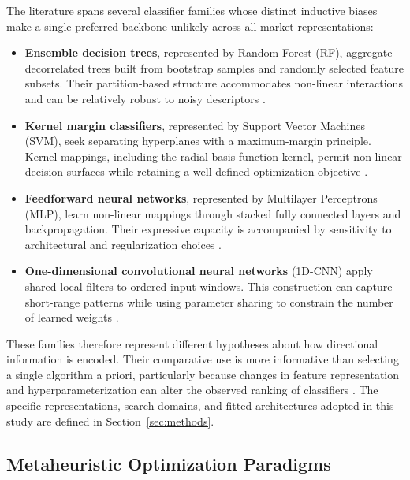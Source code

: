 The literature spans several classifier families whose distinct inductive biases make a single preferred backbone unlikely across all market representations:
\begin{itemize}
    \item \textbf{Ensemble decision trees}, represented by Random Forest (RF), aggregate decorrelated trees built from bootstrap samples and randomly selected feature subsets. Their partition-based structure accommodates non-linear interactions and can be relatively robust to noisy descriptors \cite{nabipour2020predicting}.
    \item \textbf{Kernel margin classifiers}, represented by Support Vector Machines (SVM), seek separating hyperplanes with a maximum-margin principle. Kernel mappings, including the radial-basis-function kernel, permit non-linear decision surfaces while retaining a well-defined optimization objective \cite{naik2019optimal}.
    \item \textbf{Feedforward neural networks}, represented by Multilayer Perceptrons (MLP), learn non-linear mappings through stacked fully connected layers and backpropagation. Their expressive capacity is accompanied by sensitivity to architectural and regularization choices \cite{ecer2020mlp_ga_pso}.
    \item \textbf{One-dimensional convolutional neural networks} (1D-CNN) apply shared local filters to ordered input windows. This construction can capture short-range patterns while using parameter sharing to constrain the number of learned weights \cite{bandgar2025finchronos, dhingra2025solar}.
\end{itemize}

These families therefore represent different hypotheses about how directional information is encoded. Their comparative use is more informative than selecting a single algorithm a priori, particularly because changes in feature representation and hyperparameterization can alter the observed ranking of classifiers \cite{nabipour2020predicting, mutinda2026hybrid}. The specific representations, search domains, and fitted architectures adopted in this study are defined in Section~\ref{sec:methods}.

\subsection{Metaheuristic Optimization Paradigms}\label{subsec:metaheuristic_paradigms}

